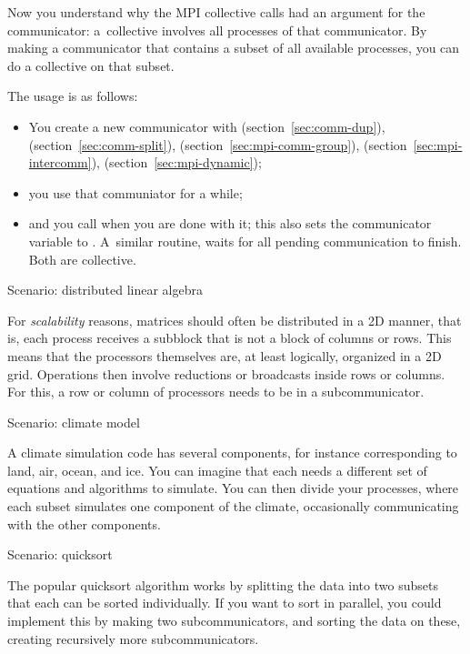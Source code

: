 Now you understand why the MPI collective calls had an argument for the
communicator: a~collective involves all processes of that communicator.
By making a communicator that contains a subset of all available processes,
you can do a collective on that subset.

The usage is as follows:
\begin{itemize}
\item You create a new communicator with 
  (section~\ref{sec:comm-dup}),
   (section~\ref{sec:comm-split}),
   (section~\ref{sec:mpi-comm-group}),
   (section~\ref{sec:mpi-intercomm}),
   (section~\ref{sec:mpi-dynamic});
\item you use that communiator for a while;
\item and you call  when you are done with it;
  this also sets the communicator variable to .
  A~similar routine,  waits for all pending
  communication to finish. Both are collective.
\end{itemize}

 {Scenario: distributed linear algebra}

For \emph{scalability} reasons, matrices should often be distributed
in a 2D manner, that is, each process receives a subblock that is not
a block of columns or rows. This means that the processors themselves
are, at least logically, organized in a 2D grid. Operations
then involve reductions or broadcasts inside rows or columns. For
this, a row or column of processors needs to be in a subcommunicator.

 {Scenario: climate model}

A climate simulation code has several components, for instance corresponding
to land, air, ocean, and ice. You can imagine that each needs a different set
of equations and algorithms to simulate. You can then divide your processes,
where each subset simulates one component of the climate, occasionally communicating
with the other components.

 {Scenario: quicksort}

The popular quicksort algorithm works by splitting the data
into two subsets that each can be sorted individually.
If you want to sort in parallel, you could implement this by making two subcommunicators,
and sorting the data on these, creating recursively more subcommunicators.

